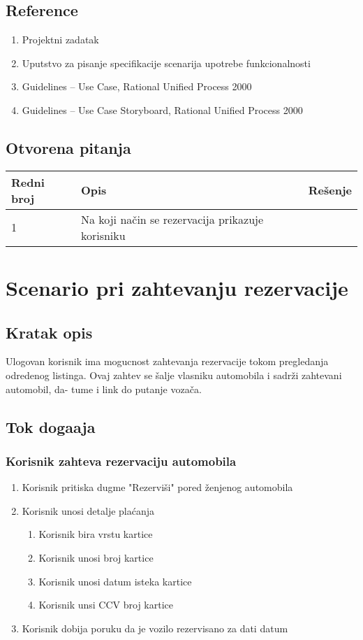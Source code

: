 \documentclass[12pt]{article}
\begin{document}
\subsection{Reference}
\begin{enumerate}
   \item Projektni zadatak
   \item Uputstvo za pisanje specifikacije scenarija upotrebe funkcionalnosti
   \item  Guidelines – Use Case, Rational Unified Process 2000
   \item  Guidelines – Use Case Storyboard, Rational Unified Process 2000
 \end{enumerate}
\subsection{Otvorena pitanja}


\begin{center}
\begin{tabular}{ | m{2cm} | m{7cm}| m{7cm} | } 
\hline
Redni broj& Opis & Rešenje \\ 
\hline
1 & Na koji način se rezervacija prikazuje korisniku & \\ 
\hline
\end{tabular}
\end{center}

    

\section{Scenario pri zahtevanju rezervacije}
\subsection{Kratak opis}
Ulogovan korisnik ima mogucnost zahtevanja rezervacije tokom pregledanja odredenog
listinga. Ovaj zahtev se šalje vlasniku automobila i sadrži zahtevani automobil, da-
tume i link do putanje vozača.
\subsection{Tok doga\dj aja}

\subsubsection{Korisnik zahteva rezervaciju automobila}
\begin{enumerate}
  \item Korisnik pritiska dugme "Rezerviši" pored ženjenog automobila
  \item Korisnik unosi detalje plaćanja
  \begin{enumerate}
    \item Korisnik bira vrstu kartice
    \item Korisnik unosi broj kartice
    \item Korisnik unosi datum isteka kartice
    \item Korisnik unsi CCV broj kartice
\end{enumerate}
  \item Korisnik dobija poruku da je vozilo rezervisano za dati datum
  
\end{enumerate}
\end{document}
